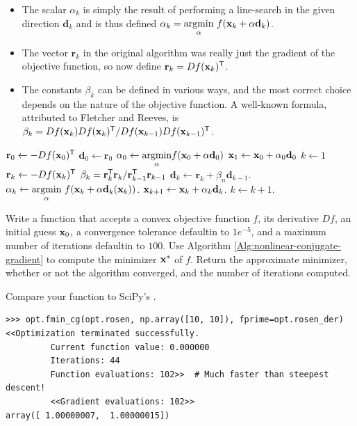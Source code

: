 \begin{itemize}
\item The scalar $\alpha_k$ is simply the result of performing a line-search in the given direction $\mathbf{d}_k$ and is thus defined $\alpha_k = \underset{\alpha}{\text{argmin}}\ f(\mathbf{x}_k + \alpha \mathbf{d}_k)$.
\item The vector $\mathbf{r}_k$ in the original algorithm was really just the gradient of the objective function, so now define $\mathbf{r}_k = Df(\mathbf{x}_k)^{\mathsf T}$.
\item The constants $\beta_k$ can be defined in various ways, and the most correct choice depends on the nature of the objective function.
A well-known formula, attributed to Fletcher and Reeves, is $\beta_{k} = Df(\mathbf{x}_k)Df(\mathbf{x}_{k})^{\mathsf T} / Df(\mathbf{x}_{k-1}) Df(\mathbf{x}_{k-1})^{\mathsf T}$.
\end{itemize}
%

\begin{algorithm}[H]
\begin{algorithmic}[1]
    \State $\mathbf{r}_0 \gets -Df(\mathbf{x}_0)^{\mathsf T}$
    \State $\mathbf{d}_0 \gets \mathbf{r}_0$
    \State $\alpha_0 \gets \underset{\alpha}{\text{argmin}} f(\mathbf{x}_0 + \alpha\mathbf{d}_0)$
    \State $\mathbf{x}_{1} \gets \mathbf{x}_0 + \alpha_0 \mathbf{d}_0$
    \State $k \gets 1$
        \State $\mathbf{r}_{k} \gets -Df(\mathbf{x}_k)^{\mathsf T}$
        \State $\beta_{k} = \mathbf{r}_{k}^{\mathsf T} \mathbf{r}_k / \mathbf{r}_{k-1}^{\mathsf T} \mathbf{r}_{k-1}$
        \State $\mathbf{d}_{k} \gets \mathbf{r}_{k} + \beta_{n}\mathbf{d}_{k-1}$.
        \State $\alpha_k \gets \underset{\alpha}{\text{argmin}}\ f(\mathbf{x}_k + \alpha\mathbf{d}_k (\mathbf{x}_k))$.
        \State $\mathbf{x}_{k+1} \gets \mathbf{x}_k + \alpha_k\mathbf{d}_k$.
        \State $k \gets k+1$.
    \EndWhile
\EndProcedure
\end{algorithmic}
\caption{}
\label{Alg:nonlinear-conjugate-gradient}
\end{algorithm}

\begin{problem}
Write a function that accepts a convex objective function $f$, its derivative $Df$, an initial guess $\mathbf{x}_0$, a convergence tolerance defaultin to $1e^{-5}$, and a maximum number of iterations defaultin to $100$.
Use Algorithm \ref{Alg:nonlinear-conjugate-gradient} to compute the minimizer $\mathbf{x}^*$ of $f$.
Return the approximate minimizer, whether or not the algorithm converged, and the number of iterations computed.

Compare your function to SciPy's .
\begin{lstlisting}
>>> opt.fmin_cg(opt.rosen, np.array([10, 10]), fprime=opt.rosen_der)
<<Optimization terminated successfully.
         Current function value: 0.000000
         Iterations: 44
         Function evaluations: 102>>  # Much faster than steepest descent!
         <<Gradient evaluations: 102>>
array([ 1.00000007,  1.00000015])
\end{lstlisting}
\label{prob:gradientdescent-nonlinear-cg}
\end{problem}

